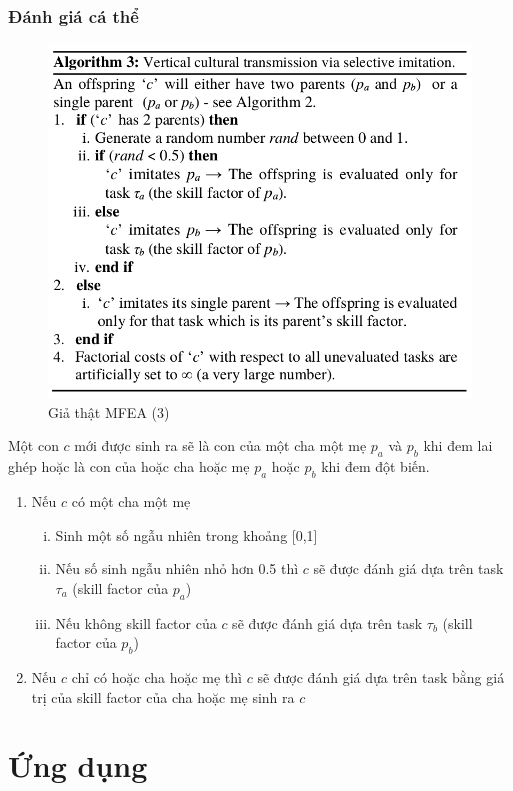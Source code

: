 \documentclass[a4paper,12pt]{report}
\begin{document}
\subsection{Đánh giá cá thể}
\begin{figure}[H]
\centering 
\includegraphics[scale=0.7]{al3.png}
\caption{Giả thật MFEA (3)}
\end{figure} 
Một con $c$ mới được sinh ra sẽ là con của một cha một mẹ $p_a$ và $p_b$ khi đem lai ghép hoặc là con của hoặc cha hoặc mẹ $p_a$ hoặc $p_b$ khi đem đột biến.
\begin{enumerate}
\item Nếu $c$ có một cha một mẹ 
\begin{enumerate}[i.]
\item Sinh một số ngẫu nhiên trong khoảng [0,1]
\item Nếu số sinh ngẫu nhiên nhỏ hơn 0.5 thì $c$ sẽ được đánh giá dựa trên task $\tau_a$ (skill factor của $p_a$)
\item Nếu không skill factor của $c$ sẽ được đánh giá dựa trên task $\tau_b$ (skill factor của $p_b$)
\end{enumerate}
\item Nếu $c$ chỉ có hoặc cha hoặc mẹ thì $c$ sẽ được đánh giá dựa trên task bằng giá trị của skill factor của cha hoặc mẹ sinh ra $c$
\end{enumerate}

\chapter{Ứng dụng}
\end{document}
